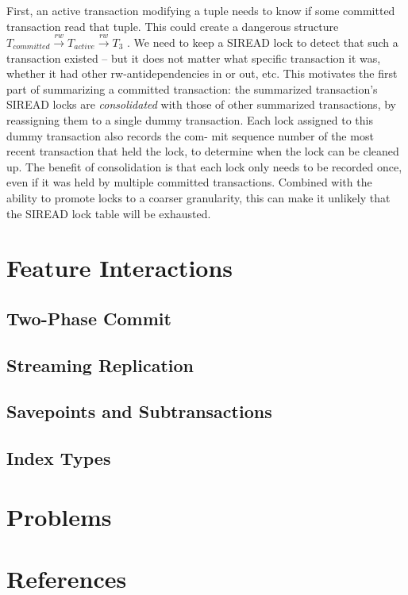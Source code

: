 \documentclass[11pt]{article}
\begin{document}
        First, an active transaction modifying a tuple needs to know if some committed transaction read that
        tuple. This could create a dangerous structure
        \(T_{committed}\xrightarrow{rw}T_{active}\xrightarrow{rw}T_3\) . We need to keep a SIREAD lock to
        detect that such a transaction existed – but it does not matter what specific transaction it was,
        whether it had other rw-antidependencies in or out, etc. This motivates the first part of summarizing
        a committed transaction: the summarized transaction’s SIREAD locks are \emph{consolidated} with those of
        other summarized transactions, by reassigning them to a single dummy transaction.
Each lock assigned to this dummy transaction also records the com-
mit sequence number of the most recent transaction that held the
lock, to determine when the lock can be cleaned up. The benefit of
consolidation is that each lock only needs to be recorded once, even
if it was held by multiple committed transactions. Combined with
the ability to promote locks to a coarser granularity, this can make it
unlikely that the SIREAD lock table will be exhausted.
\section{Feature Interactions}
\label{sec:org0972c21}
\subsection{Two-Phase Commit}
\label{sec:orgf0c1ff0}
\subsection{Streaming Replication}
\label{sec:orgfb14a34}
\subsection{Savepoints and Subtransactions}
\label{sec:org083a7d9}
\subsection{Index Types}
\label{sec:org4625905}
\section{Problems}
\label{sec:org40f8c21}


\section{References}
\label{sec:orgb0de7d2}
\label{bibliographystyle link}


\label{bibliography link}

\end{document}
